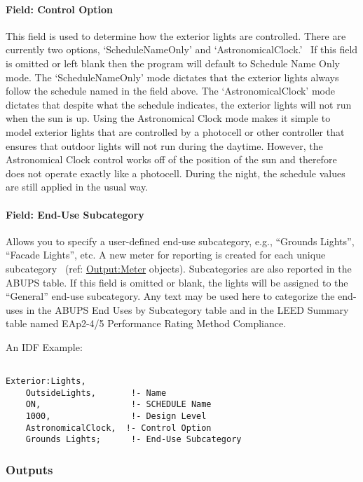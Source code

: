 \paragraph{Field: Control Option}\label{field-control-option}

This field is used to determine how the exterior lights are controlled. There are currently two options, `ScheduleNameOnly' and `AstronomicalClock.'~ If this field is omitted or left blank then the program will default to Schedule Name Only mode. The `ScheduleNameOnly' mode dictates that the exterior lights always follow the schedule named in the field above. The `AstronomicalClock' mode dictates that despite what the schedule indicates, the exterior lights will not run when the sun is up. Using the Astronomical Clock mode makes it simple to model exterior lights that are controlled by a photocell or other controller that ensures that outdoor lights will not run during the daytime. However, the Astronomical Clock control works off of the position of the sun and therefore does not operate exactly like a photocell. During the night, the schedule values are still applied in the usual way.

\paragraph{Field: End-Use Subcategory}\label{field-end-use-subcategory-000}

Allows you to specify a user-defined end-use subcategory, e.g., ``Grounds Lights'', ``Facade Lights'', etc. A new meter for reporting is created for each unique subcategory~ (ref: \hyperref[outputmeter-and-outputmetermeterfileonly]{Output:Meter} objects). Subcategories are also reported in the ABUPS table. If this field is omitted or blank, the lights will be assigned to the ``General'' end-use subcategory. Any text may be used here to categorize the end-uses in the ABUPS End Uses by Subcategory table and in the LEED Summary table named EAp2-4/5 Performance Rating Method Compliance.

An IDF Example:

\begin{lstlisting}

Exterior:Lights,
    OutsideLights,       !- Name
    ON,                  !- SCHEDULE Name
    1000,                !- Design Level
    AstronomicalClock,  !- Control Option
    Grounds Lights;      !- End-Use Subcategory
\end{lstlisting}

\subsubsection{Outputs}\label{outputs-012}

